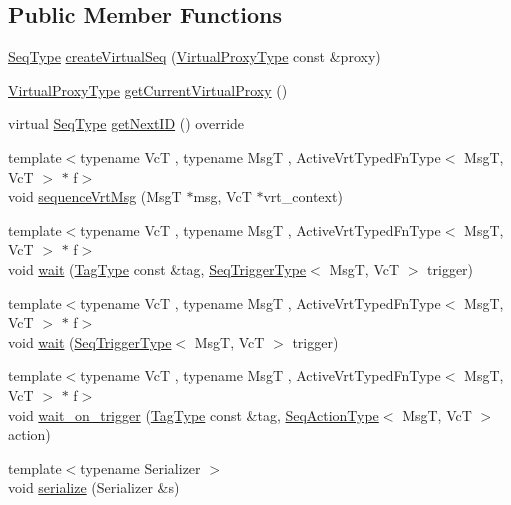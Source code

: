 \subsection*{Public Member Functions}
\begin{DoxyCompactItemize}
\item 
\hyperlink{structvt_1_1seq_1_1_tagged_sequencer_a1c8ee839258d0f88c49ef660267a81d5}{Seq\+Type} \hyperlink{structvt_1_1seq_1_1_tagged_sequencer_vrt_af7d9b524bcfab43dbc06c3a6b3e140f0}{create\+Virtual\+Seq} (\hyperlink{namespacevt_a1b417dd5d684f045bb58a0ede70045ac}{Virtual\+Proxy\+Type} const \&proxy)
\item 
\hyperlink{namespacevt_a1b417dd5d684f045bb58a0ede70045ac}{Virtual\+Proxy\+Type} \hyperlink{structvt_1_1seq_1_1_tagged_sequencer_vrt_ab022ac29916fd6b9df9161567cbbd910}{get\+Current\+Virtual\+Proxy} ()
\item 
virtual \hyperlink{structvt_1_1seq_1_1_tagged_sequencer_a1c8ee839258d0f88c49ef660267a81d5}{Seq\+Type} \hyperlink{structvt_1_1seq_1_1_tagged_sequencer_vrt_a2dff0d8c70573a608c199b81657a19cb}{get\+Next\+ID} () override
\item 
{\footnotesize template$<$typename VcT , typename MsgT , Active\+Vrt\+Typed\+Fn\+Type$<$ Msg\+T, Vc\+T $>$ $\ast$ f$>$ }\\void \hyperlink{structvt_1_1seq_1_1_tagged_sequencer_vrt_aae7a0943397b44e3f43160008e2b8d42}{sequence\+Vrt\+Msg} (MsgT $\ast$msg, VcT $\ast$vrt\+\_\+context)
\item 
{\footnotesize template$<$typename VcT , typename MsgT , Active\+Vrt\+Typed\+Fn\+Type$<$ Msg\+T, Vc\+T $>$ $\ast$ f$>$ }\\void \hyperlink{structvt_1_1seq_1_1_tagged_sequencer_vrt_a8897cf74185e38e4d6b222bdab539f31}{wait} (\hyperlink{namespacevt_a84ab281dae04a52a4b243d6bf62d0e52}{Tag\+Type} const \&tag, \hyperlink{structvt_1_1seq_1_1_tagged_sequencer_a4b015f2f7d3197a66af5576f0e63a834}{Seq\+Trigger\+Type}$<$ MsgT, VcT $>$ trigger)
\item 
{\footnotesize template$<$typename VcT , typename MsgT , Active\+Vrt\+Typed\+Fn\+Type$<$ Msg\+T, Vc\+T $>$ $\ast$ f$>$ }\\void \hyperlink{structvt_1_1seq_1_1_tagged_sequencer_vrt_a88706e19289453ba99602e50dff901dd}{wait} (\hyperlink{structvt_1_1seq_1_1_tagged_sequencer_a4b015f2f7d3197a66af5576f0e63a834}{Seq\+Trigger\+Type}$<$ MsgT, VcT $>$ trigger)
\item 
{\footnotesize template$<$typename VcT , typename MsgT , Active\+Vrt\+Typed\+Fn\+Type$<$ Msg\+T, Vc\+T $>$ $\ast$ f$>$ }\\void \hyperlink{structvt_1_1seq_1_1_tagged_sequencer_vrt_a768f8c419f42b3dad84ebce3f046f0e9}{wait\+\_\+on\+\_\+trigger} (\hyperlink{namespacevt_a84ab281dae04a52a4b243d6bf62d0e52}{Tag\+Type} const \&tag, \hyperlink{structvt_1_1seq_1_1_tagged_sequencer_a0210dbd34288d440e0cd51db9d6637bd}{Seq\+Action\+Type}$<$ MsgT, VcT $>$ action)
\item 
{\footnotesize template$<$typename Serializer $>$ }\\void \hyperlink{structvt_1_1seq_1_1_tagged_sequencer_vrt_a3850647893a2df249aef2d89ace29f6b}{serialize} (Serializer \&s)
\end{DoxyCompactItemize}
